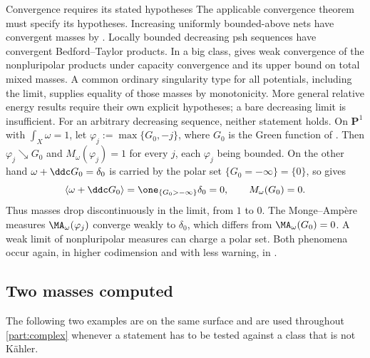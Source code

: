 \begin{warning}{Convergence requires its stated hypotheses}
\label{warn:ch51-continuity-rules}
The applicable convergence theorem must specify its hypotheses.
Increasing uniformly bounded-above nets have convergent masses by
.  Locally bounded decreasing psh
sequences have convergent Bedford--Taylor products.  In a big class,
\cite[Theorem~2.3]{DDNL18mono} gives weak convergence of the
nonpluripolar products under capacity convergence and its upper bound
on total mixed masses.  A common ordinary singularity type for all
potentials, including the limit, supplies equality of those masses by
monotonicity.  More general relative energy results require their own
explicit hypotheses; a bare decreasing limit is insufficient.
For an arbitrary decreasing sequence, neither statement holds.  On
$\mathbf P^1$ with $\int_X\omega=1$, let
$\varphi_j:=\max\{G_0,-j\}$, where $G_0$ is the Green function of
.  Then $\varphi_j\searrow G_0$ and
$M_\omega(\varphi_j)=1$ for every $j$, each $\varphi_j$ being
bounded.  On the other hand $\omega+\ddc G_0=\delta_0$ is carried by
the polar set $\{G_0=-\infty\}=\{0\}$, so
 gives
\[
 \langle\omega+\ddc G_0\rangle
 =\one_{\{G_0>-\infty\}}\delta_0=0,
 \qquad
 M_\omega(G_0)=0 .
\]
Thus masses drop discontinuously in the limit, from $1$ to $0$.  The Monge--Amp\`ere measures
$\MA_\omega(\varphi_j)$ converge weakly to $\delta_0$, which
differs from $\MA_\omega(G_0)=0$.  A weak limit of nonpluripolar
measures can charge a polar set.  Both phenomena occur again, in higher codimension and with less
warning, in .
\end{warning}

\subsection{Two masses computed}
\label{sec:ch51-masses-computed}

The following two examples are on the same surface and are used
throughout \cref{part:complex} whenever a statement has to be tested
against a class that is not K\"ahler.

